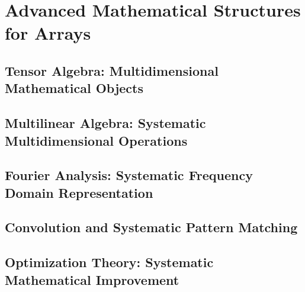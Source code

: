 \documentclass[12pt, oneside, openany]{book}
\begin{document}

\chapter{Advanced Mathematical Structures for Arrays}

\section{Tensor Algebra: Multidimensional Mathematical Objects}

\section{Multilinear Algebra: Systematic Multidimensional Operations}

\section{Fourier Analysis: Systematic Frequency Domain Representation}

\section{Convolution and Systematic Pattern Matching}

\section{Optimization Theory: Systematic Mathematical Improvement}

\end{document}
